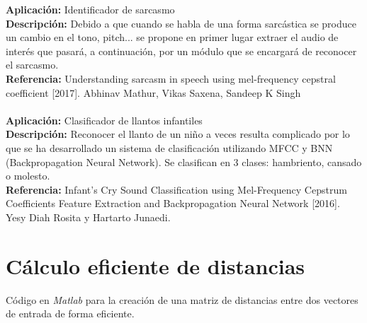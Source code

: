 \documentclass[12pt]{article}
\begin{document}
\textbf{Aplicación:} Identificador de sarcasmo\\
\textbf{Descripción:} Debido a que cuando se habla de una forma sarcástica se produce un cambio en el tono, pitch... se propone en primer lugar extraer el audio de interés que pasará, a continuación, por un módulo que se encargará de reconocer el sarcasmo.\\
\textbf{Referencia:} Understanding sarcasm in speech using mel-frequency cepstral coefficient [2017]. Abhinav Mathur, Vikas Saxena, Sandeep K Singh\\\\

\textbf{Aplicación:} Clasificador de llantos infantiles\\
\textbf{Descripción:}  Reconocer el llanto de un niño a veces resulta complicado por lo que se ha desarrollado un sistema de clasificación utilizando MFCC y BNN (Backpropagation Neural Network). Se clasifican en 3 clases: hambriento, cansado o molesto.\\
\textbf{Referencia:} Infant’s Cry Sound Classification using Mel-Frequency Cepstrum Coefficients Feature Extraction and Backpropagation Neural Network [2016]. Yesy Diah Rosita y Hartarto Junaedi.\\


\section{Cálculo eficiente de distancias}
Código en \textit{Matlab} para la creación de una matriz de distancias entre dos vectores de entrada de forma eficiente.\\


\end{document}
